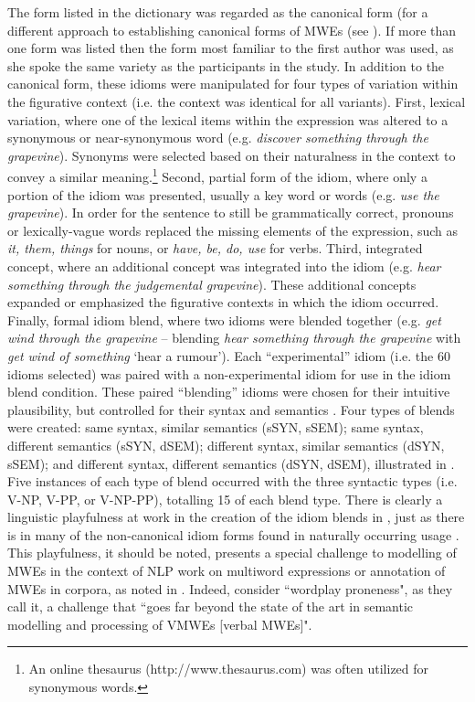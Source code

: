 \documentclass[output=paper,modfonts,nonflat]{langsci/langscibook}
\begin{document}
The form listed in the dictionary was regarded as the canonical form (for a different approach to establishing canonical forms of MWEs (see ). If more than one form was listed then the form most familiar to the first author was used, as she spoke the same variety as the participants in the study. In addition to the canonical form, these idioms were manipulated for four types of variation within the figurative context (i.e. the context was identical for all variants). First, lexical variation, where one of the lexical items within the expression was altered to a synonymous or near-synonymous word (e.g. \textit{discover something through the grapevine}). Synonyms were selected based on their naturalness in the context to convey a similar meaning.\footnote{An online thesaurus (http://www.thesaurus.com) was often utilized for synonymous words.} Second, partial form of the idiom, where only a portion of the idiom was presented, usually a key word or words (e.g. \textit{use the grapevine}). In order for the sentence to still be grammatically correct, pronouns or lexically-vague words replaced the missing elements of the expression, such as \textit{it, them, things} for nouns, or \textit{have, be, do, use} for verbs. Third, integrated concept, where an additional concept was integrated into the idiom (e.g. \textit{hear something through the judgemental grapevine}). These additional concepts expanded or emphasized the figurative contexts in which the idiom occurred. Finally, formal idiom blend, where two idioms were blended together (e.g. \textit{get wind through the grapevine} -- blending \textit{hear something through the grapevine} with \textit{get wind of something} `hear a rumour'). Each ``experimental'' idiom (i.e. the 60 idioms selected) was paired with a non-experimental idiom for use in the idiom blend condition. These paired ``blending'' idioms were chosen for their intuitive plausibility, but controlled for their syntax and semantics \citep{CuttingBock1997}. Four types of blends were created: same syntax, similar semantics (sSYN, sSEM); same syntax, different semantics (sSYN, dSEM); different syntax, similar semantics (dSYN, sSEM); and different syntax, different semantics (dSYN, dSEM), illustrated in . Five instances of each type of blend occurred with the three syntactic types (i.e. V-NP, V-PP, or V-NP-PP), totalling 15 of each blend type. There is clearly a linguistic playfulness at work in the creation of the idiom blends in , just as there is in many of the non-canonical idiom forms found in naturally occurring usage \citep[cf.][]{Moon1998,Duffley2013}. This playfulness, it should be noted, presents a special challenge to modelling of MWEs in the context of NLP work on multiword expressions or annotation of MWEs in corpora, as noted in . Indeed,  consider ``wordplay proneness", as they call it, a challenge that ``goes far beyond the state of the art in semantic modelling and processing of VMWEs [verbal MWEs]".
\end{document}
